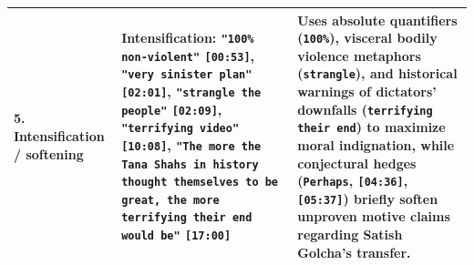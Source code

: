 \documentclass[10pt,a4paper]{article}
\begin{document}
\begin{longtable}{@{}>{\raggedright\arraybackslash}p{} >{\raggedright\arraybackslash}p{} >{\raggedright\arraybackslash}p{}@{}}
\addlinespace[4pt]
\textbf{5. Intensification / softening} & \textbf{Intensification:} \texttt{"100\% non-violent"} \texttt{[00:53]}, \texttt{"very sinister plan"} \texttt{[02:01]}, \texttt{"strangle the people"} \texttt{[02:09]}, \texttt{"terrifying video"} \texttt{[10:08]}, \texttt{"The more the Tana Shahs in history thought themselves to be great, the more terrifying their end would be"} \texttt{[17:00]} & Uses absolute quantifiers (\texttt{100\%}), visceral bodily violence metaphors (\texttt{strangle}), and historical warnings of dictators' downfalls (\texttt{terrifying their end}) to maximize moral indignation, while conjectural hedges (\texttt{Perhaps}, \texttt{[04:36]}, \texttt{[05:37]}) briefly soften unproven motive claims regarding Satish Golcha's transfer. \\
\bottomrule
\end{longtable}
\end{document}
